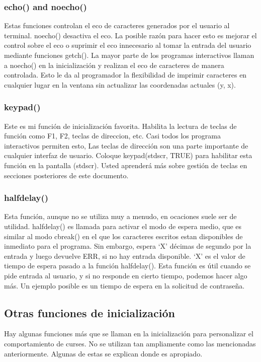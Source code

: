 \documentclass{article}
\begin{document}
\subsubsection{echo() and noecho()}%
Estas funciones controlan el eco de caracteres generados por el usuario al
terminal. noecho() desactiva el eco. La posible razón para hacer esto es
mejorar el control sobre el eco o suprimir el eco innecesario al tomar la
entrada del usuario mediante funciones getch(). La mayor parte de los programas
interactivos llaman a noecho() en la inicialización y realizan el eco de
caracteres de manera controlada. Esto le da al programador la flexibilidad de
imprimir caracteres en cualquier lugar en la ventana sin actualizar las
coordenadas actuales (y, x).

\subsubsection{keypad()}%
Este es mi función de inicialización favorita. Habilita la lectura de teclas de
función como F1, F2, teclas de direccion, etc. Casi todos los programa
interactivos permiten esto, Las teclas de dirección son una parte importante de
cualquier interfaz de usuario. Coloque keypad(stdscr, TRUE) para habilitar esta
función en la pantalla (stdscr). Usted aprenderá más sobre gestión de teclas en
secciones posteriores de este documento.

\subsubsection{halfdelay()}%
Esta función, aunque no se utiliza muy a menudo, en ocaciones suele ser de
utilidad. halfdelay() es llamada para activar el modo de espera medio, que es
similar al modo cbreak() en el que los caracteres escritos estan disponibles de
inmediato para el programa. Sin embargo, espera ‘X’ décimas de segundo por la
entrada y luego devuelve ERR, si no hay entrada disponible. ‘X’ es el valor de
tiempo de espera pasado a la función halfdelay(). Esta función es útil cuando
se pide entrada al usuario, y si no responde en cierto tiempo, podemos hacer
algo más. Un ejemplo posible es un tiempo de espera en la solicitud de
contraseña.

\subsection{Otras funciones de inicialización}%
Hay algunas funciones más que se llaman en la inicialización para personalizar
el comportamiento de curses. No se utilizan tan ampliamente como las
mencionadas anteriormente. Algunas de estas se explican donde es apropiado.
\end{document}
